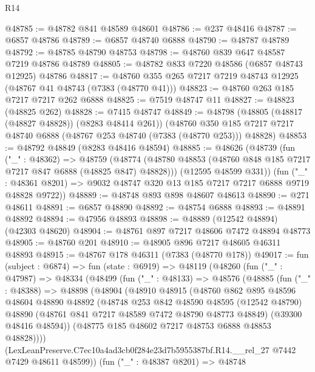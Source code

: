 \begin{lexlean}{R14}
\begin{coremodule}
@48785 := @48782 @841 @48589 @48601
@48786 := @237 @48416
@48787 := @6857 @48786
@48789 := @6857 @48740 @6888
@48790 := @48787 @48789
@48792 := @48785 @48790 @48753
@48798 := @48760 @839 @647 @48587 @7219 @48786 @48789
@48805 := @48782 @833 @7220 @48586 (@6857 @48743 @12925) @48786
@48817 := @48760 @355 @265 @7217 @7219 @48743 @12925 (@48767 @41 @48743 (@7383 (@48770 @41)))
@48823 := @48760 @263 @185 @7217 @7217 @262 @6888
@48825 := @7519 @48747 @11
@48827 := @48823 (@48825 @262)
@48828 := @7415 @48747
@48849 := @48798
    (@48805 (@48817 (@48827 @48828)) (@8283 @48414 @261))
    (@48760 @350 @185 @7217 @7217 @48740 @6888 (@48767 @253 @48740 (@7383 (@48770 @253))) @48828)
@48853 := @48792 @48849 (@8283 @48416 @48594)
@48885 := @48626
    (@48739
      (fun ("_" : @48362) =>
      @48759
        (@48774 (@48780 @48853 (@48760 @848 @185 @7217 @7217 @847 @6888 (@48825 @847) @48828)))
        (@12595 @48599 @331))
      (fun ("_" : @48361 @8201) => @9032 @48747 @320 @13 @185 @7217 @7217 @6888 @9719 @48828 @9722))
@48889 := @48748 @893 @898 @48607 @48613
@48890 := @271 @48611
@48891 := @6857 @48890
@48892 := @48754 @6888
@48893 := @48891 @48892
@48894 := @47956 @48893
@48898 := @48889 (@12542 @48894) (@42303 @48620)
@48904 := @48761 @897 @7217 @48606 @7472 @48894 @48773
@48905 := @48760 @201
@48910 := @48905 @896 @7217 @48605 @46311 @48893
@48915 := @48767 @178 @46311 (@7383 (@48770 @178))
@49017 := fun (subject : @6874) =>
  fun (state : @6919) =>
  @48119
    (@48260
      (fun ("_" : @47987) =>
      @48334
        (@48499
          (fun ("_" : @48133) =>
          @48576
            (@48885
              (fun ("_" : @48388) =>
              @48898
                (@48904
                  (@48910
                    @48915
                    (@48760
                      @862
                      @895
                      @48596
                      @48604
                      @48890
                      @48892
                      (@48748
                        @253
                        @842
                        @48590
                        @48595
                        (@12542 @48790)
                        @48890
                        (@48761 @841 @7217 @48589 @7472 @48790 @48773 @48849)
                        (@39300 @48416 @48594))
                      (@48775 @185 @48602 @7217 @48753 @6888 @48853 @48828))))
                (LexLeanPreserve.C7ec10a4ad3cb0f284e23d7b5955387bf.R14.__rel_27
                  @7442
                  @7429
                  @48611
                  @48599))
              (fun ("_" : @48387 @8201) =>
              @48748

\end{coremodule}
\end{lexlean}
